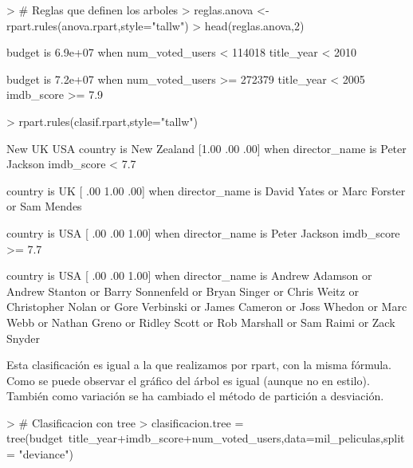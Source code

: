 \documentclass[a4paper]{article}
\begin{document}
\begin{Schunk}
\begin{Sinput}
> # Reglas que definen los arboles
> reglas.anova <-rpart.rules(anova.rpart,style="tallw")
> head(reglas.anova,2)
\end{Sinput}
\begin{Soutput}
budget is 6.9e+07 when
                  num_voted_users < 114018
                  title_year < 2010

budget is 7.2e+07 when
                  num_voted_users >= 272379
                  title_year < 2005
                  imdb_score >= 7.9
\end{Soutput}
\begin{Sinput}
> rpart.rules(clasif.rpart,style="tallw")
\end{Sinput}
\begin{Soutput}
                        New    UK  USA 
country is New Zealand [1.00  .00  .00] when
                                        director_name is Peter Jackson
                                        imdb_score < 7.7

country is UK          [ .00 1.00  .00] when
                                        director_name is David Yates or Marc Forster or Sam Mendes

country is USA         [ .00  .00 1.00] when
                                        director_name is Peter Jackson
                                        imdb_score >= 7.7

country is USA         [ .00  .00 1.00] when
                                        director_name is Andrew Adamson or Andrew Stanton or Barry Sonnenfeld or Bryan Singer or Chris Weitz or Christopher Nolan or Gore Verbinski or James Cameron or Joss Whedon or Marc Webb or Nathan Greno or Ridley Scott or Rob Marshall or Sam Raimi or Zack Snyder
\end{Soutput}
\end{Schunk}

Esta clasificación es igual a la que realizamos por rpart, con la misma fórmula. Como se puede observar el gráfico del árbol es igual (aunque no en estilo). También como variación se ha cambiado el método de partición a desviación.

\begin{Schunk}
\begin{Sinput}
> # Clasificacion con tree
> clasificacion.tree = tree(budget~title_year+imdb_score+num_voted_users,data=mil_peliculas,split = "deviance")
\end{Sinput}
\end{Schunk}
\end{document}
